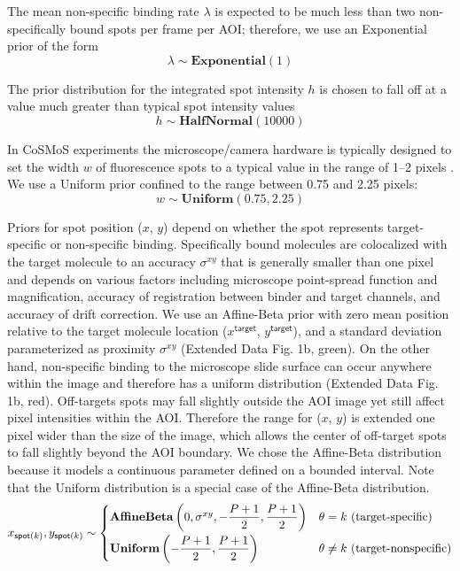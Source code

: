 The mean non-specific binding rate $\lambda$ is expected to be much less than two non-specifically bound spots per frame per AOI; therefore, we use an Exponential prior of the form
%
\begin{equation}
    \lambda \sim \mathbf{Exponential}(1)
\end{equation}

The prior distribution for the integrated spot intensity $h$ is chosen to fall off at a value much greater than typical spot intensity values 
%
\begin{equation}
    h \sim \mathbf{HalfNormal}(10000)
\end{equation}

In CoSMoS experiments the microscope/camera hardware is typically designed to set the width $w$ of fluorescence spots to a  typical value in the range of 1--2 pixels \cite{Ober2015-ba}. We use a Uniform prior confined to the range between 0.75 and 2.25 pixels:
%
\begin{equation}
    w \sim \mathbf{Uniform}(0.75, 2.25)
\end{equation}

Priors for spot position ($x$, $y$) depend on whether the spot represents target-specific or non-specific binding. Specifically bound molecules are colocalized with the target molecule to an accuracy $\sigma^{xy}$ that is generally smaller than one pixel and depends on various factors including microscope point-spread function and magnification, accuracy of registration between binder and target channels, and accuracy of drift correction. We use an Affine-Beta prior with zero mean position relative to the target molecule location ($x^\mathsf{target}$, $y^\mathsf{target}$), and a standard deviation parameterized as proximity $\sigma^{xy} $ (Extended Data Fig. 1b, green). On the other hand, non-specific binding to the microscope slide surface can occur anywhere within the image and therefore has a uniform distribution (Extended Data Fig. 1b, red).  Off-targets spots may fall slightly outside the AOI image yet still affect pixel intensities within the AOI.  Therefore the range for ($x$, $y$) is extended one pixel wider than the size of the image, which allows the center of off-target spots to fall slightly beyond the AOI boundary. We chose the Affine-Beta distribution because it models a continuous parameter defined on a bounded interval. Note that the Uniform distribution is a special case of the Affine-Beta distribution.
%
\begin{equation}
    x_{\mathsf{spot}(k)}, y_{\mathsf{spot}(k)} \sim
    \begin{cases}
        \mathbf{AffineBeta}\left( 0, \sigma^{xy}, -\dfrac{P+1}{2}, \dfrac{P+1}{2} \right) & \theta = k ~\textrm{(target-specific)} \\
        \mathbf{Uniform}\left(-\dfrac{P+1}{2}, \dfrac{P+1}{2} \right) & \theta \neq k ~\text{(target-nonspecific)} \rule{0pt}{4ex}
    \end{cases}
\end{equation}

